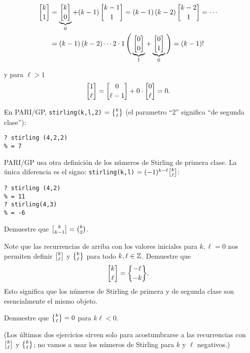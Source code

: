 \documentclass{article}
\begin{document}
\begin{align*}
\stirling{k}{1} & = \underbrace{\stirling{k}{0}}_0 + (k-1)\,\stirling{k-1}{1} = (k-1)\,(k-2)\,\stirling{k-2}{1} = \cdots \\
 & = (k-1)\,(k-2)\cdots 2\cdot 1 \, \Bigg(\underbrace{\stirling{0}{0}}_1 + \underbrace{\stirling{0}{1}}_0 \Bigg) = (k-1)!
\end{align*}

\noindent y para $\ell > 1$
$$\stirling{1}{\ell} = \stirling{0}{\ell-1} + 0\cdot \stirling{0}{\ell} = 0.$$

\begin{shaded}
\small\noindent En PARI/GP, \verb|stirling(k,l,2)| $= \Stirling{k}{\ell}$ (el parametro ``$2$'' significa ``de segunda clase''):

\begin{verbatim}
? stirling (4,2,2)
% = 7
\end{verbatim}

\noindent PARI/GP usa otra definición de los números de Stirling de primera clase. La única diferencia es el signo: \verb|stirling(k,l)| $= (-1)^{k-\ell} \stirling{k}{\ell}$:

\begin{verbatim}
? stirling (4,2)  
% = 11
? stirling(4,3)  
% = -6
\end{verbatim}
\end{shaded}

\begin{ejercicio*}
Demuestre que $\stirling{k}{k-1} = {k \choose 2}$.
\end{ejercicio*}

\begin{ejercicio*}
Note que las recurrencias de arriba con los valores iniciales para $k, \ell = 0$ nos permiten definir $\stirling{k}{\ell}$ y $\Stirling{k}{\ell}$ para todo $k,\ell \in \mathbb{Z}$. Demuestre que
$$\stirling{k}{\ell} = \Stirling{-\ell}{-k}.$$
Esto significa que los números de Stirling de primera y de segunda clase son esencialmente el mismo objeto.
\end{ejercicio*}

\begin{ejercicio*}
Demuestre que $\Stirling{k}{\ell} = 0$ para $k\ell < 0$.
\end{ejercicio*}

\noindent (Los últimos dos ejercicios sirven solo para acostumbrarse a las recurrencias con $\stirling{k}{\ell}$ y $\Stirling{k}{\ell}$; no vamos a usar los números de Stirling para $k$ y $\ell$ negativos.)
\end{document}
